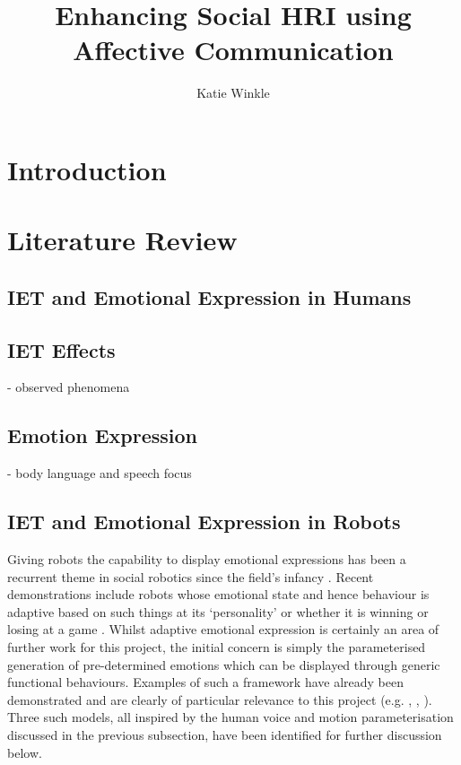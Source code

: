 \documentclass[11pt,a4paper]{report}
\title{Enhancing Social HRI using Affective Communication}
\author{Katie Winkle}
\begin{document}
\maketitle

\chapter{Introduction}

\chapter{Literature Review}

\section{IET and Emotional Expression in Humans}
\section{IET Effects}
- observed phenomena 
\section{Emotion Expression}
- body language and speech focus

\section{IET and Emotional Expression in Robots}
Giving robots the capability to display emotional expressions has been a recurrent theme in social robotics since the field's infancy \citep{breazeal1999build}. Recent demonstrations include robots whose emotional state and hence behaviour is adaptive based on such things at its `personality' \citep{park2009robot} or whether it is winning or losing at a game \citep{tielman2014adaptive}. Whilst adaptive emotional expression is certainly an area of further work for this project, the initial concern is simply the parameterised generation of pre-determined emotions which can be displayed through generic functional behaviours. Examples of such a framework have already been demonstrated and are clearly of particular relevance to this project (e.g. \citep{masuda2010motion}, \citep{lim2011converting}, \citep{xu2013mood}). Three such models, all inspired by the human  voice and motion parameterisation discussed in the previous subsection, have been identified for further discussion below.  
\end{document}
